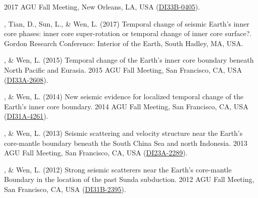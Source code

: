\begin{etaremune}
    2017 AGU Fall Meeting, New Orleans, LA, USA (\href{http://adsabs.harvard.edu/abs/2017AGUFMDI33B0405Y}{DI33B-0405}).
\item
    \Yao, Tian, D., Sun, L., \& Wen, L. (2017)
    Temporal change of seismic Earth's inner core phases: inner core super-rotation or temporal change of inner core surface?.
    Gordon Research Conference: Interior of the Earth, South Hadley, MA, USA.
\item
    \Yao, \& Wen, L. (2015)
    Temporal change of the Earth's inner core boundary beneath North Pacific and Eurasia.
    2015 AGU Fall Meeting, San Francisco, CA, USA (\href{http://adsabs.harvard.edu/abs/2015AGUFMDI33A2608Y}{DI33A-2608}).
\item
    \Yao, \& Wen, L. (2014)
    New seismic evidence for localized temporal change of the Earth's inner core boundary.
    2014 AGU Fall Meeting, San Francisco, CA, USA (\href{http://adsabs.harvard.edu/abs/2014AGUFMDI31A4261Y}{DI31A-4261}).
\item
    \Yao, \& Wen, L. (2013)
    Seismic scattering and velocity structure near the Earth's core-mantle boundary beneath the South China Sea and north Indonesia.
    2013 AGU Fall Meeting, San Francisco, CA, USA (\href{http://adsabs.harvard.edu/abs/2013AGUFMDI23A2289Y}{DI23A-2289}).
\item
    \Yao, \& Wen, L. (2012)
    Strong seismic scatterers near the Earth's core-mantle Boundary in the location of the past Sunda subduction.
    2012 AGU Fall Meeting, San Francisco, CA, USA (\href{http://adsabs.harvard.edu/abs/2012AGUFMDI31B2395Y}{DI31B-2395}).
\end{etaremune}
